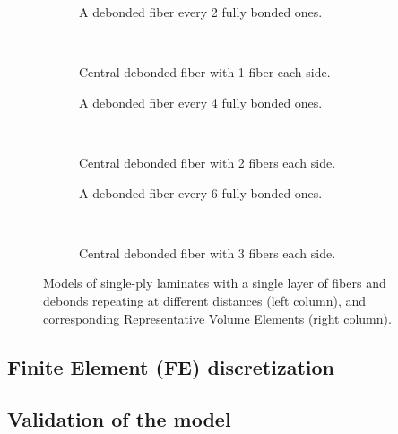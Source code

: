 \documentclass[review]{elsarticle}
\begin{document}
\begin{figure}[!h]
\centering
\centering
    \begin{subfigure}[b]{0.45\textwidth}
        \caption{A debonded fiber every 2 fully bonded ones.}\label{subfig:every2}
    \end{subfigure} ~
    \begin{subfigure}[b]{0.45\textwidth}
        \caption{Central debonded fiber with 1 fiber each side.}\label{subfig:1eachside}
    \end{subfigure}

    \begin{subfigure}[b]{0.45\textwidth}
        \caption{A debonded fiber every 4 fully bonded ones.}\label{subfig:every4}
    \end{subfigure} ~
    \begin{subfigure}[b]{0.45\textwidth}
        \caption{Central debonded fiber with 2 fibers each side.}\label{subfig:2eachside}
    \end{subfigure}

    \begin{subfigure}[b]{0.45\textwidth}
        \caption{A debonded fiber every 6 fully bonded ones.}\label{subfig:every6}
    \end{subfigure} ~
    \begin{subfigure}[b]{0.45\textwidth}
        \caption{Central debonded fiber with 3 fibers each side.}\label{subfig:3eachside}
    \end{subfigure}
\caption{Models of single-ply laminates with a single layer of fibers and debonds repeating at different distances (left column), and corresponding Representative Volume Elements (right column).}\label{fig:fibersOnSideModels}
\end{figure}

\subsection{Finite Element (FE) discretization}

\subsection{Validation of the model}
\end{document}
